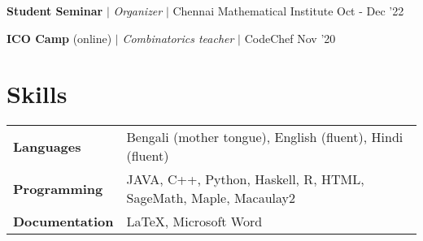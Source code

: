 \resumeProjectHeading
{\textbf{Student Seminar} $|$ \textit{Organizer} $|$ Chennai Mathematical Institute}
{Oct - Dec '22}
{}
\vspace{\mygap}

\resumeProjectHeading
{\textbf{ICO Camp}  (online) $|$ \textit{Combinatorics teacher} $|$ CodeChef}
{Nov '20}
{}


\resumeSubHeadingListEnd




\section{Skills}

\begin{tabular*}{\textwidth}{l @{\hskip 0.5in} l}
\textbf{Languages} & Bengali (mother tongue), English (fluent), Hindi (fluent)\\
\textbf{Programming}  & {JAVA, C++, Python, Haskell, R, HTML, SageMath, Maple, Macaulay2} \\
\textbf {Documentation} & {\LaTeX, Microsoft Word} \\
\end{tabular*}









